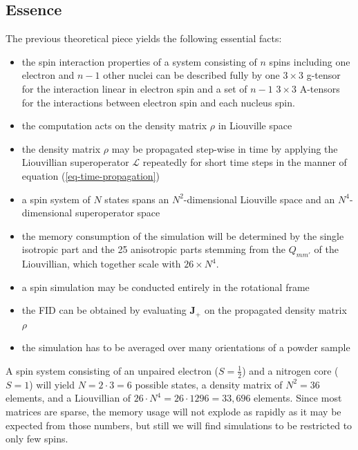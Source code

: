 \documentclass[11.5pt,a4paper]{article}
\begin{document}
\subsection{Essence}
The previous theoretical piece yields the following essential facts:
\begin{itemize}
  \item the spin interaction properties of a system consisting of $n$ spins including one electron and $n-1$ other nuclei can be described fully by one $3 \times 3$ g-tensor for the interaction linear in electron spin and a set of $n-1$ $3 \times 3$ A-tensors for the interactions between electron spin and each nucleus spin.
  \item the computation acts on the density matrix $\rho$ in Liouville space
  \item the density matrix $\rho$ may be propagated step-wise in time by applying the Liouvillian superoperator $\mathcal{L}$ repeatedly for short time steps in the manner of equation (\ref{eq-time-propagation})
  \item a spin system of $N$ states spans an $N^2$-dimensional Liouville space and an $N^4$-dimensional superoperator space
  \item the memory consumption of the simulation will be determined by the single isotropic part and the 25 anisotropic parts stemming from the $Q_{mm'}$ of the Liouvillian, which together scale with $26 \times N^4$.
  \item a spin simulation may be conducted entirely in the rotational frame
  \item the FID can be obtained by evaluating $\mathbf{J_+}$ on the propagated density matrix $\rho$
  \item the simulation has to be averaged over many orientations of a powder sample
\end{itemize}
A spin system consisting of an unpaired electron ($S=\tfrac{1}{2}$) and a nitrogen core ($S=1$) will yield $N = 2 \cdot 3 = 6$ possible states, a density matrix of $N^2 = 36$ elements, and a Liouvillian of $26 \cdot N^4=26 \cdot 1296 = 33,696$ elements. Since most matrices are sparse, the memory usage will not explode as rapidly as it may be expected from those numbers, but still we will find simulations to be restricted to only few spins.
\end{document}

